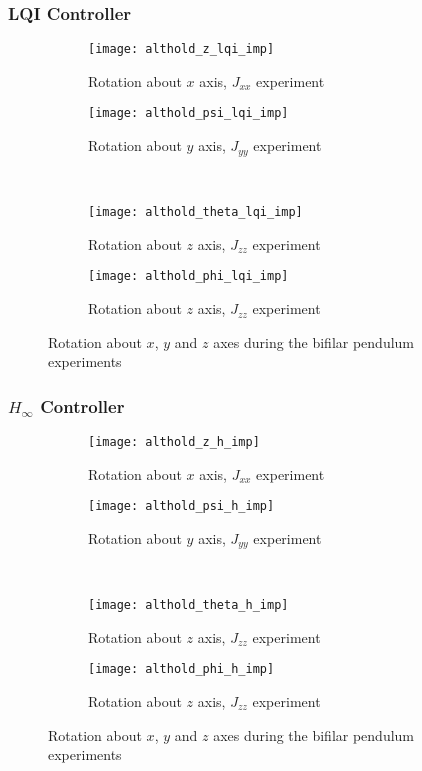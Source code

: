 \subsubsection{LQI Controller}

\begin{figure}[H]
\begin{subfigure}{.5\linewidth}
\centering
\texttt{[image: althold\_z\_lqi\_imp]}
\caption{Rotation about $x$ axis, $J_{xx}$ experiment}
\label{fig:althold_z_lqi_imp}
\end{subfigure}%
\begin{subfigure}{.5\linewidth}
\centering
\texttt{[image: althold\_psi\_lqi\_imp]}
\caption{Rotation about $y$ axis, $J_{yy}$ experiment}
\label{fig:althold_psi_lqi_imp}
\end{subfigure}\\[1ex]
\begin{subfigure}{0.5\linewidth}
\centering
\texttt{[image: althold\_theta\_lqi\_imp]}
\caption{Rotation about $z$ axis, $J_{zz}$ experiment}
\label{fig:althold_theta_lqi_imp}
\end{subfigure}
\begin{subfigure}{0.5\linewidth}
\centering
\texttt{[image: althold\_phi\_lqi\_imp]}
\caption{Rotation about $z$ axis, $J_{zz}$ experiment}
\label{fig:althold_phi_lqi_imp}
\end{subfigure}
\caption{Rotation about $x$, $y$ and $z$ axes during the bifilar pendulum experiments}
\label{fig:althold_lqi_imp}
\end{figure}


\subsubsection{$H_\infty$ Controller}

\begin{figure}[H]
\begin{subfigure}{.5\linewidth}
\centering
\texttt{[image: althold\_z\_h\_imp]}
\caption{Rotation about $x$ axis, $J_{xx}$ experiment}
\label{fig:althold_z_h_imp}
\end{subfigure}%
\begin{subfigure}{.5\linewidth}
\centering
\texttt{[image: althold\_psi\_h\_imp]}
\caption{Rotation about $y$ axis, $J_{yy}$ experiment}
\label{fig:althold_psi_h_imp}
\end{subfigure}\\[1ex]
\begin{subfigure}{0.5\linewidth}
\centering
\texttt{[image: althold\_theta\_h\_imp]}
\caption{Rotation about $z$ axis, $J_{zz}$ experiment}
\label{fig:althold_theta_h_imp}
\end{subfigure}
\begin{subfigure}{0.5\linewidth}
\centering
\texttt{[image: althold\_phi\_h\_imp]}
\caption{Rotation about $z$ axis, $J_{zz}$ experiment}
\label{fig:althold_phi_h_imp}
\end{subfigure}
\caption{Rotation about $x$, $y$ and $z$ axes during the bifilar pendulum experiments}
\label{fig:althold_h_imp}
\end{figure}



